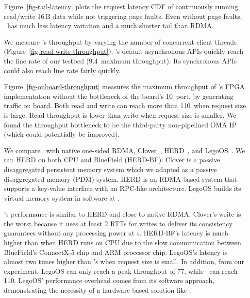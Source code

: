 Figure~\ref{fig-tail-latency} plots the request latency CDF of continuously running read/write 16\,B data while not triggering page faults.
Even without page faults, \sys\ has much less latency variation and a much shorter tail than RDMA.



We measure \sys's throughput by varying the number of concurrent client threads (Figure~\ref{fig-read-write-throughput}).
\sys's default asynchronous APIs quickly reach the line rate of our testbed (9.4\Gbps\ maximum throughput).
Its synchronous APIs could also reach line rate fairly quickly.

Figure~\ref{fig-onboard-throughput} measures the maximum throughput of \sys's FPGA implementation without the bottleneck of the board's 10\Gbps\ port, by generating traffic on board.
Both read and write can reach more than 110\Gbps\ when request size is large.
Read throughput is lower than write when request size is smaller.
We found the throughput bottleneck to be the third-party non-pipelined DMA IP
(which could potentially be improved).

We compare \sys\ with native one-sided RDMA, Clover~\cite{Tsai20-ATC}, HERD~\cite{Kalia14-RDMAKV}, and LegoOS~\cite{Shan18-OSDI}.
We ran HERD on both CPU and BlueField (HERD-BF).
Clover is a passive disaggregated persistent memory system which we adapted as a passive disaggregated memory (PDM) system.
HERD is an RDMA-based system that supports a key-value interface with an RPC-like architecture.
LegoOS builds its virtual memory system in software at \MN.

\sys's performance is similar to HERD and close to native RDMA.
Clover's write is the worst because it uses at least 2 RTTs for writes to deliver its consistency guarantees without any processing power at \MN{}s.
HERD-BF's latency is much higher than when HERD runs on CPU
due to the slow communication between BlueField's ConnectX-5 chip and ARM processor chip.
LegoOS's latency is almost two times higher than \sys's when request size is small.
In addition, from our experiment, LegoOS can only reach a peak throughput of 77\Gbps, while \sys\ can reach 110\Gbps.
LegoOS' performance overhead comes from its software approach, demonstrating the necessity of a hardware-based solution like \sys.

